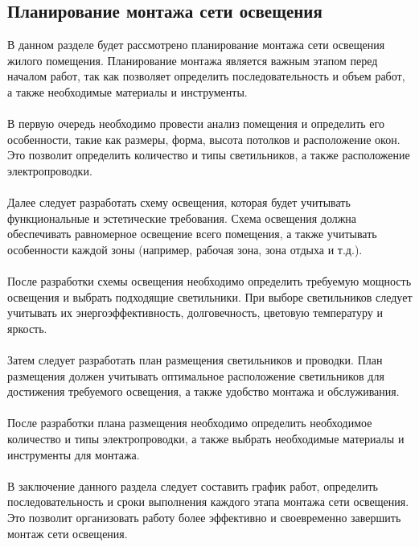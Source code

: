 \documentclass{article}
\begin{document}
\subsection{Планирование монтажа сети освещения}
В данном разделе будет рассмотрено планирование монтажа сети освещения жилого помещения. Планирование монтажа является важным этапом перед началом работ, так как позволяет определить последовательность и объем работ, а также необходимые материалы и инструменты.\\
~\\
В первую очередь необходимо провести анализ помещения и определить его особенности, такие как размеры, форма, высота потолков и расположение окон. Это позволит определить количество и типы светильников, а также расположение электропроводки.\\
~\\
Далее следует разработать схему освещения, которая будет учитывать функциональные и эстетические требования. Схема освещения должна обеспечивать равномерное освещение всего помещения, а также учитывать особенности каждой зоны (например, рабочая зона, зона отдыха и т.д.).\\
~\\
После разработки схемы освещения необходимо определить требуемую мощность освещения и выбрать подходящие светильники. При выборе светильников следует учитывать их энергоэффективность, долговечность, цветовую температуру и яркость.\\
~\\
Затем следует разработать план размещения светильников и проводки. План размещения должен учитывать оптимальное расположение светильников для достижения требуемого освещения, а также удобство монтажа и обслуживания.\\
~\\
После разработки плана размещения необходимо определить необходимое количество и типы электропроводки, а также выбрать необходимые материалы и инструменты для монтажа.\\
~\\
В заключение данного раздела следует составить график работ, определить последовательность и сроки выполнения каждого этапа монтажа сети освещения. Это позволит организовать работу более эффективно и своевременно завершить монтаж сети освещения.
\end{document}
